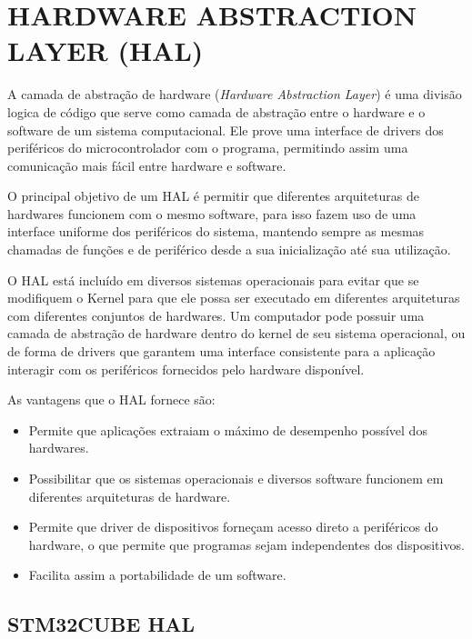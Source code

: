 

\section{HARDWARE ABSTRACTION LAYER (HAL)}
A camada de abstração de hardware (\textit{Hardware Abstraction Layer}) é uma divisão logica de código que serve como camada de abstração entre o hardware e o software de um sistema computacional. Ele prove uma interface de drivers dos periféricos do microcontrolador com o programa, permitindo assim uma comunicação mais fácil entre hardware e software.

O principal objetivo de um HAL é permitir que diferentes arquiteturas de hardwares funcionem com o mesmo software, para isso fazem uso de uma interface uniforme dos periféricos do sistema, mantendo sempre as mesmas chamadas de funções e de periférico desde a sua inicialização até sua utilização.

O HAL está incluído em diversos sistemas operacionais para evitar que se modifiquem o Kernel para que ele possa ser executado em diferentes arquiteturas com diferentes conjuntos de hardwares. Um computador pode possuir uma camada de abstração de hardware dentro do kernel de seu sistema operacional, ou de forma de drivers que garantem uma interface consistente para a aplicação interagir com os periféricos fornecidos pelo hardware disponível.

As vantagens que o HAL fornece são:
\begin{itemize}
    \item Permite que aplicações extraiam o máximo de desempenho possível dos hardwares.
    \item Possibilitar que os sistemas operacionais e diversos software funcionem em diferentes arquiteturas de hardware.
    \item Permite que driver de dispositivos forneçam acesso direto a periféricos do hardware, o que permite que programas sejam independentes dos dispositivos.
    \item Facilita assim a portabilidade de um software.
\end{itemize}

\subsection{STM32CUBE HAL} 

